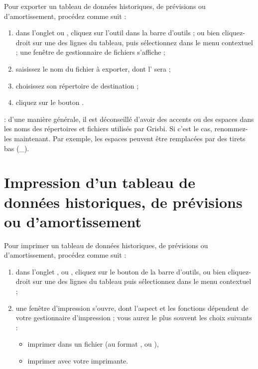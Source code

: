 Pour exporter un tableau de données historiques, de prévisions ou d'amortissement, procédez comme suit :
\begin{enumerate}
	 \item dans l'onglet  ou , cliquez sur l'outil  dans la barre d'outils ; ou bien cliquez-droit sur une des lignes du tableau, puis sélectionnez  dans le menu contextuel ; une fenêtre de gestionnaire de fichiers s'affiche ;
	 \item saisissez le nom du fichier à exporter, dont l' sera  ;
	 \item choisissez son répertoire de destination ;
	 \item cliquez sur le bouton .
\end{enumerate}

 : d'une manière générale, il est déconseillé d'avoir des accents ou des espaces dans les noms des répertoires et fichiers utilisés par Grisbi. Si c'est le cas, renommez-les maintenant. Par exemple, les espaces peuvent être remplacées par des tirets bas (\_). 


\section{Impression d'un tableau de données historiques, de prévisions ou d'amortissement\label{budget-print}}

Pour imprimer un tableau de données historiques, de prévisions ou d'amortissement, procédez comme suit :

\begin{enumerate}
	 \item dans l'onglet ,  ou , cliquez sur le bouton  de la barre d'outils, ou bien cliquez-droit sur une des lignes du tableau puis sélectionnez  dans le menu contextuel ;
	 \item  une fenêtre d'impression s'ouvre, dont l'aspect et les fonctions dépendent de votre gestionnaire d'impression ; vous aurez le plus souvent les choix suivants :
		  \begin{itemize}
			  \item imprimer dans un fichier (au format ,  ou ),
			  \item imprimer avec votre imprimante.
		  \end{itemize}
\end{enumerate}

